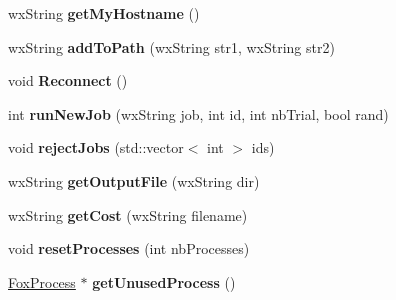\begin{DoxyCompactItemize}
\mbox{\label{class_fox_client_a9705e8168b1fe935eae21d5f93201fb3}} 
wx\+String {\bfseries get\+My\+Hostname} ()
\item 
\mbox{\label{class_fox_client_a1bc180b0fb9fd846389fc5b944297129}} 
wx\+String {\bfseries add\+To\+Path} (wx\+String str1, wx\+String str2)
\item 
\mbox{\label{class_fox_client_aea98d4c1344248b8108ee79d9db3d96b}} 
void {\bfseries Reconnect} ()
\item 
\mbox{\label{class_fox_client_aa2fe1f64618d1c3e9cb1be87df91bea8}} 
int {\bfseries run\+New\+Job} (wx\+String job, int id, int nb\+Trial, bool rand)
\item 
\mbox{\label{class_fox_client_ad4211d406a890ed1c2f4ad6b87c2d6b4}} 
void {\bfseries reject\+Jobs} (std\+::vector$<$ int $>$ ids)
\item 
\mbox{\label{class_fox_client_af8017f1ef0c19bf1aad64e5e0f6d0150}} 
wx\+String {\bfseries get\+Output\+File} (wx\+String dir)
\item 
\mbox{\label{class_fox_client_a6531a85876e486aea2c7ed5d4a2f0ef5}} 
wx\+String {\bfseries get\+Cost} (wx\+String filename)
\item 
\mbox{\label{class_fox_client_ae2016d63ee57852f35ca4cb96a3530ca}} 
void {\bfseries reset\+Processes} (int nb\+Processes)
\item 
\mbox{\label{class_fox_client_abc256d0590ebb525417dbdcf0e94b567}} 
\mbox{\hyperlink{class_fox_process}{Fox\+Process}} $\ast$ {\bfseries get\+Unused\+Process} ()
\end{DoxyCompactItemize}
